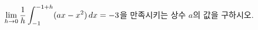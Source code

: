 $\displaystyle\lim_{h\to 0}\dfrac{1}{h}\int_{-1}^{-1+h}(ax-x^2)\mkern3mu dx=-3$을 만족시키는 상수 $a$의 값을 구하시오.
